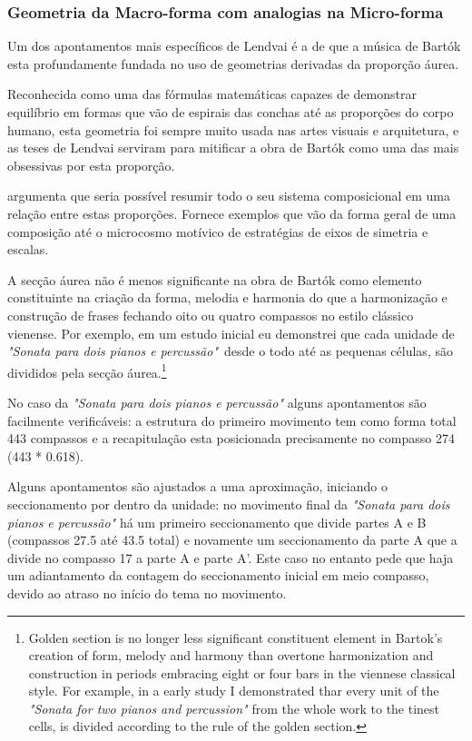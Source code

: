 \documentclass[
	12pt,				%
	openright,			%
	twoside,			%
	a4paper,			%
	english,			%
	french,				%
	spanish,			%
	brazil				%
	]{abntex2}
\begin{document}
\pagebreak
\subsubsection{Geometria da Macro-forma com analogias na Micro-forma}

Um dos apontamentos mais específicos de Lendvai é a de que a música de Bartók esta profundamente fundada no uso de geometrias derivadas da proporção áurea. 

Reconhecida como uma das fórmulas matemáticas capazes de demonstrar equilíbrio em formas que vão de espirais das conchas até as proporções do corpo humano, esta geometria foi sempre muito usada nas artes visuais e arquitetura, e as teses de Lendvai serviram para mitificar a obra de Bartók como uma das mais obsessivas por esta proporção.

 argumenta que seria possível resumir todo o seu sistema composicional em uma relação entre estas proporções. Fornece exemplos que vão da forma geral de uma composição até o microcosmo motívico de estratégias de eixos de simetria e escalas.


\begin{citacao}
A secção áurea não é menos significante na obra de Bartók como elemento constituinte na criação da forma, melodia e harmonia do que a harmonização e construção de frases fechando oito ou quatro compassos no estilo clássico vienense.
Por exemplo, em um estudo inicial eu demonstrei que cada unidade de \textit{"Sonata para dois pianos e percussão"}\ desde o todo até as pequenas células, são divididos pela secção áurea.\cite[ p.175]{lendvai1962duality}\footnote{
Golden section is no longer less significant constituent element in Bartok's creation of form, melody and harmony than overtone harmonization and construction in periods embracing eight or four bars in the viennese classical style. For example, in a early study I demonstrated thar every unit of the \textit{"Sonata for two pianos and percussion"} from the whole work to the tinest cells, is divided according to the rule of the golden section.\cite[ p.175]{lendvai1962duality}}
\end{citacao}

No caso da \textit{"Sonata para dois pianos e percussão"} alguns apontamentos são facilmente verificáveis: a estrutura do primeiro movimento tem como forma total 443 compassos e a recapitulação esta posicionada precisamente no compasso 274 (443 * 0.618).

Alguns apontamentos são ajustados a uma aproximação, iniciando o seccionamento por dentro da unidade: no movimento final da \textit{"Sonata para dois pianos e percussão"} há um primeiro seccionamento que divide partes A e B (compassos 27.5 até 43.5 total) e novamente um seccionamento da parte A que a divide no compasso 17 a parte A e parte A'. Este caso no entanto pede que haja um adiantamento da contagem do seccionamento inicial em meio compasso, devido ao atraso no início do tema no movimento.
\end{document}
